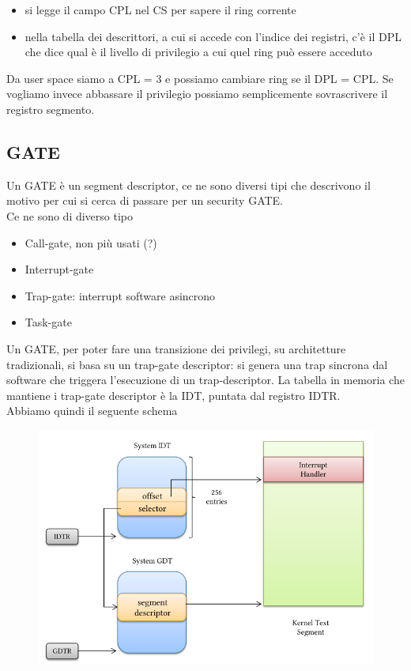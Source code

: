\documentclass[12pt, oneside]{extbook} %
\begin{document}
\begin{itemize}
\item si legge il campo CPL nel CS per sapere il ring corrente
\item nella tabella dei descrittori, a cui si accede con l'indice dei registri, c'è il DPL che dice qual è il livello di privilegio a cui quel ring può essere acceduto
\end{itemize}
Da user space siamo a CPL = 3 e possiamo cambiare ring se il DPL = CPL. Se vogliamo invece abbassare il privilegio possiamo semplicemente sovrascrivere il registro segmento.
\subsection{GATE}
Un GATE è un segment descriptor, ce ne sono diversi tipi che descrivono il motivo per cui si cerca di passare per un security GATE.\\Ce ne sono di diverso tipo
\begin{itemize}
\item Call-gate, non più usati (?)
\item Interrupt-gate
\item Trap-gate: interrupt software asincrono
\item Task-gate
\end{itemize}
Un GATE, per poter fare una transizione dei privilegi, su architetture tradizionali, si basa su un trap-gate descriptor: si genera una trap sincrona dal software che triggera l'esecuzione di un trap-descriptor. La tabella in memoria che mantiene i trap-gate descriptor è la IDT, puntata dal registro IDTR.\\Abbiamo quindi il seguente schema\\
\begin{figure}[!h]
	\includegraphics[scale=0.4]{immagini/idt_gdt.png}
\end{figure}\\\\
\end{document}
